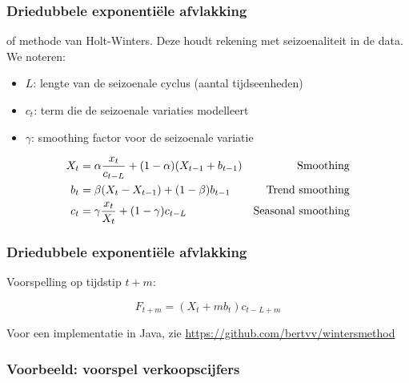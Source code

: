 \documentclass[aspectratio=169]{beamer}
\begin{document}
\begin{frame}
  \frametitle{Driedubbele exponentiële afvlakking}

  of methode van Holt-Winters. Deze houdt rekening met seizoenaliteit in de data. We noteren:

  \begin{itemize}
    \item $L$: lengte van de seizoenale cyclus (aantal tijdseenheden)
    \item $c_t$: term die de seizoenale variaties modelleert
    \item $\gamma$: smoothing factor voor de seizoenale variatie
  \end{itemize}

\begin{align*}
	X_{t} &= \alpha \frac{x_{t}}{c_{t-L}} + (1-\alpha) (X_{t-1} + b_{t-1}) & \textnormal{Smoothing}\\
	b_{t} &= \beta (X_{t} - X_{t-1}) + (1-\beta)b_{t-1} & \textnormal{Trend smoothing} \\
	c_{t} &= \gamma \frac{x_{t}}{X_{t}} + (1-\gamma)c_{t-L} & \textnormal{Seasonal smoothing} \\
\label{eq:HoltWinters}
\end{align*}

\end{frame}

\begin{frame}
  \frametitle{Driedubbele exponentiële afvlakking}

  Voorspelling op tijdstip $t + m$:

  \[ F_{t+m} = (X_{t} + mb_{t})c_{t-L+m} \]

  Voor een implementatie in Java, zie \url{https://github.com/bertvv/wintersmethod}
\end{frame}

\begin{frame}
  \frametitle{Voorbeeld: voorspel verkoopscijfers}

  \centering
\end{frame}
\end{document}
